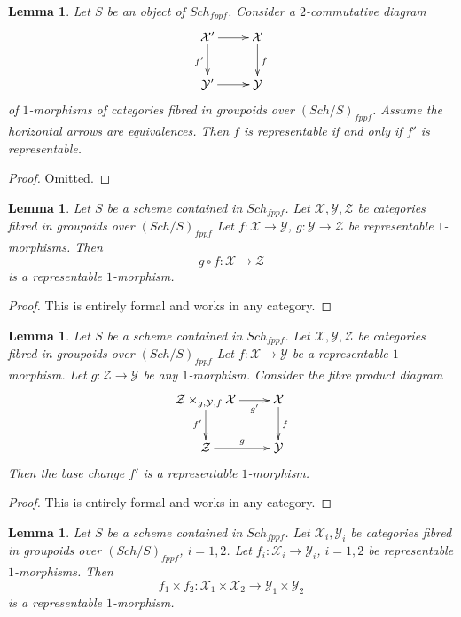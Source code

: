 \documentclass{stacks-project}
\theoremstyle{plain}
\newtheorem{lemma}[subsection]{Lemma}
\theoremstyle{definition}
\theoremstyle{remark}
\numberwithin{equation}{subsection}
\def\Sch{\mathit{Sch}}
\begin{document}
\begin{lemma}
\label{lemma-representable-morphism-equivalent}
Let $S$ be an object of $\Sch_{fppf}$.
Consider a $2$-commutative diagram
$$
\xymatrix{
\mathcal{X}' \ar[r] \ar[d]_{f'} & \mathcal{X} \ar[d]^f \\
\mathcal{Y}' \ar[r] & \mathcal{Y}
}
$$
of $1$-morphisms of categories fibred in groupoids over
$(\Sch/S)_{fppf}$.
Assume the horizontal arrows are equivalences.
Then $f$ is representable if and only if $f'$ is representable.
\end{lemma}

\begin{proof}
Omitted.
\end{proof}

\begin{lemma}
\label{lemma-composition-representable-transformations}
Let $S$ be a scheme contained in $\Sch_{fppf}$.
Let $\mathcal{X}, \mathcal{Y}, \mathcal{Z}$
be categories fibred in groupoids over $(\Sch/S)_{fppf}$
Let $f : \mathcal{X} \to \mathcal{Y}$, $g : \mathcal{Y} \to \mathcal{Z}$
be representable $1$-morphisms. Then
$$
g \circ f : \mathcal{X} \longrightarrow \mathcal{Z}
$$
is a representable $1$-morphism.
\end{lemma}

\begin{proof}
This is entirely formal and works in any category.
\end{proof}

\begin{lemma}
\label{lemma-base-change-representable-transformations}
Let $S$ be a scheme contained in $\Sch_{fppf}$.
Let $\mathcal{X}, \mathcal{Y}, \mathcal{Z}$
be categories fibred in groupoids over $(\Sch/S)_{fppf}$
Let $f : \mathcal{X} \to \mathcal{Y}$ be a representable $1$-morphism.
Let $g : \mathcal{Z} \to \mathcal{Y}$ be any $1$-morphism.
Consider the fibre product diagram
$$
\xymatrix{
\mathcal{Z} \times_{g, \mathcal{Y}, f} \mathcal{X} \ar[r]_-{g'} \ar[d]_{f'} &
\mathcal{X} \ar[d]^f \\
\mathcal{Z} \ar[r]^g & \mathcal{Y}
}
$$
Then the base change $f'$ is a representable $1$-morphism.
\end{lemma}

\begin{proof}
This is entirely formal and works in any category.
\end{proof}

\begin{lemma}
\label{lemma-product-representable-transformations}
Let $S$ be a scheme contained in $\Sch_{fppf}$.
Let $\mathcal{X}_i, \mathcal{Y}_i$ be categories fibred in groupoids over
$(\Sch/S)_{fppf}$, $i = 1, 2$.
Let $f_i : \mathcal{X}_i \to \mathcal{Y}_i$, $i = 1, 2$
be representable $1$-morphisms.
Then
$$
f_1 \times f_2 :
\mathcal{X}_1 \times \mathcal{X}_2
\longrightarrow
\mathcal{Y}_1 \times \mathcal{Y}_2
$$
is a representable $1$-morphism.
\end{lemma}
\end{document}
